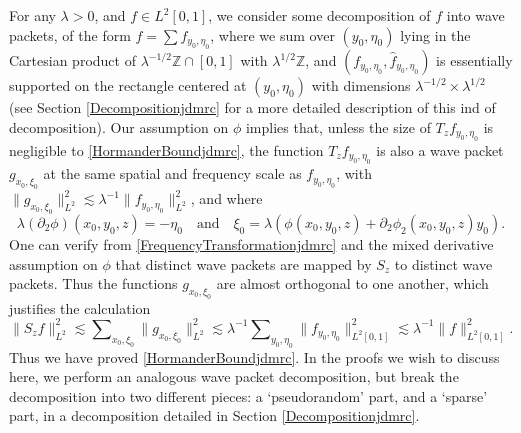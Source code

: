 \documentclass[12pt]{amsart}
\newcommand*{\Z}{\mathbb{Z}}
\begin{document}
For any $\lambda > 0$, and $f \in L^2[0,1]$, we consider some decomposition of $f$ into wave packets, of the form $f = \sum f_{y_0,\eta_0}$,
%
where we sum over $(y_0,\eta_0)$ lying in the Cartesian product of $\lambda^{-1/2} \Z \cap [0,1]$ with $\lambda^{1/2} \Z$, and $(f_{y_0,\eta_0}, \widehat{f}_{y_0,\eta_0})$ is essentially supported on the rectangle centered at $(y_0,\eta_0)$ with dimensions $\lambda^{-1/2} \times \lambda^{1/2}$ (see Section \ref{Decompositionjdmrc} for a more detailed description of this ind of decomposition).
%
%
%
Our assumption on $\phi$ implies that, unless the size of $T_z f_{y_0,\eta_0}$ is negligible to \eqref{HormanderBoundjdmrc}, the function $T_z f_{y_0,\eta_0}$ is also a wave packet $g_{x_0,\xi_0}$ at the same spatial and frequency scale as $f_{y_0,\eta_0}$, with $\| g_{x_0,\xi_0} \|_{L^2}^2 \lesssim \lambda^{-1} \| f_{y_0,\eta_0} \|_{L^2}^2$, and where
%
\begin{equation} \label{FrequencyTransformationjdmrc}
    \lambda (\partial_2 \phi)(x_0,y_0,z) = - \eta_0 \quad\text{and}\quad  \xi_0 = \lambda ( \phi(x_0,y_0,z) + \partial_2 \phi_2(x_0,y_0,z) y_0 ).
\end{equation}
%
One can verify from \eqref{FrequencyTransformationjdmrc} and the mixed derivative assumption on $\phi$ that distinct wave packets are mapped by $S_z$ to distinct wave packets. Thus the functions $g_{x_0,\xi_0}$ are almost orthogonal to one another, which justifies the calculation
%
\[ \| S_z f \|_{L^2}^2 \lesssim \sum\nolimits_{x_0,\xi_0} \| g_{x_0,\xi_0} \|_{L^2}^2 \lesssim \lambda^{-1} \sum\nolimits_{y_0,\eta_0} \| f_{y_0,\eta_0} \|_{L^2[0,1]}^2 \lesssim \lambda^{-1} \| f \|_{L^2[0,1]}^2. \]
%
Thus we have proved \eqref{HormanderBoundjdmrc}. In the proofs we wish to discuss here, we perform an analogous wave packet decomposition, but break the decomposition into two different pieces: a `pseudorandom' part, and a `sparse' part, in a decomposition detailed in Section \ref{Decompositionjdmrc}.
\end{document}
